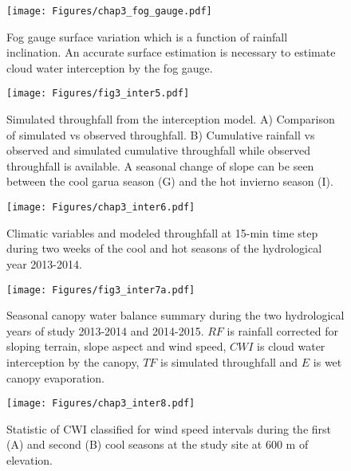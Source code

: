 \documentclass[a4paper,12pt]{article}
\begin{document}
\begin{figure}[H] \centering
  \texttt{[image: Figures/chap3\_fog\_gauge.pdf]}
  \caption[Fog gauge surface variation as a function of rainfall inclination]{Fog gauge surface variation which is a function of rainfall inclination. An accurate surface estimation is necessary to estimate cloud water interception by the fog gauge.} \label{fig3:fog_gauge} 
\end{figure}

\begin{figure}[H] \centering
  \texttt{[image: Figures/fig3\_inter5.pdf]}
  \caption[Simulated throughfall from the interception model]{Simulated throughfall from the interception model. A) Comparison of simulated vs observed throughfall. B) Cumulative rainfall vs observed and simulated cumulative throughfall while observed throughfall is available. A seasonal change of slope can be seen between the cool garua season (G) and the hot invierno season (I).} \label{fig:fog_res1} 
\end{figure}

\begin{figure}[H] \centering
  \texttt{[image: Figures/chap3\_inter6.pdf]}
  \caption[Climatic variables and modeled throughfall]{Climatic variables and modeled throughfall at 15-min time step during two weeks of the cool and hot seasons of the hydrological year 2013-2014.} \label{fig:fog_res2} 
\end{figure}

\begin{figure}[H] \centering
  \texttt{[image: Figures/fig3\_inter7a.pdf]}
  \caption[Seasonal canopy water balance summary during the two hydrological years of study]{Seasonal canopy water balance summary during the two hydrological years of study 2013-2014 and 2014-2015. $RF$ is rainfall corrected for sloping terrain, slope aspect and wind speed, $CWI$ is cloud water interception by the canopy, $TF$ is simulated throughfall and $E$ is wet canopy evaporation.} \label{fig:fog_res3} 
\end{figure}

\begin{figure}[H] \centering
  \texttt{[image: Figures/chap3\_inter8.pdf]}
  \caption[Statistic of CWI classified for wind speed intervals ]{Statistic of CWI classified for wind speed intervals during the first (A) and second (B) cool seasons at the study site at 600 m of elevation.} \label{fig:fog_res4} 
\end{figure}
\end{document}
